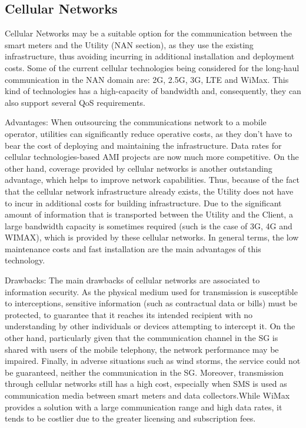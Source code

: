 \documentclass[11pt,final,onecolumn]{IEEEtran}
\begin{document}
\subsection{Cellular Networks}\label{cellular}
Cellular Networks may be a suitable option for the communication between the smart meters and the Utility (NAN section), as they use the existing infrastructure, thus avoiding incurring in additional installation and deployment costs. Some of the current cellular technologies being considered for the long-haul communication in the NAN domain are: 2G, 2.5G, 3G, LTE and WiMax. This kind of technologies has a high-capacity of bandwidth and, consequently, they can also support several QoS requirements.

Advantages: When outsourcing the communications network to a mobile operator, utilities can significantly reduce operative costs, as they don’t have to bear the cost of deploying and maintaining the infrastructure. Data rates for cellular technologies-based AMI projects are now much more competitive. On the other hand, coverage provided by cellular networks is another outstanding advantage, which helps to improve network capabilities. Thus, because of the fact that the cellular network infrastructure already exists, the Utility does not have to incur in additional costs for building infrastructure. Due to the significant amount of information that is transported between the Utility and the Client, a large bandwidth capacity is sometimes required (such is the case of 3G, 4G and WIMAX), which is provided by these cellular networks. In general terms, the low maintenance costs and fast installation are the main advantages of this technology. 

Drawbacks: The main drawbacks of cellular networks are associated to information security. As the physical medium used for transmission is susceptible to interceptions, sensitive information (such as contractual data or bills) must be protected, to guarantee that it reaches its intended recipient with no understanding by other individuals or devices attempting to intercept it. On the other hand, particularly given that the communication channel in the SG is shared with users of the mobile telephony, the network performance may be impaired. Finally, in adverse situations such as wind storms, the service could not be guaranteed, neither the communication in the SG. Moreover, transmission through cellular networks still has a high cost, especially when SMS is used as communication media between smart meters and data collectors.While WiMax provides a solution with a large communication range and high data rates, it tends to be costlier due to the greater licensing and subscription fees. 
\end{document}
